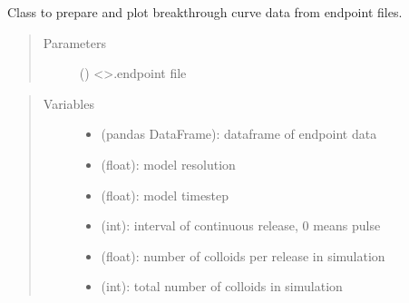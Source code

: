 \documentclass[letterpaper,10pt,english]{sphinxmanual}
\begin{document}
\begin{fulllineitems}
\begin{fulllineitems}
\begin{quote}
\begin{description}
\end{description}\end{quote}

\end{fulllineitems}


\end{fulllineitems}


\begin{fulllineitems}
\label{\detokenize{index:lb_colloids.Colloids.Colloid_output.Breakthrough}}
Class to prepare and plot breakthrough curve data from endpoint
files.
\begin{quote}\begin{description}
\item[{Parameters}] \leavevmode
{} () \textendash{} \textless{}\textgreater{}.endpoint file

\end{description}\end{quote}
\begin{quote}\begin{description}
\item[{Variables}] \leavevmode\begin{itemize}
\item {} 
 \textendash{} (pandas DataFrame): dataframe of endpoint data

\item {} 
{\hyperref[\detokenize{index:lb_colloids.LB.LB_2Dpermeability.LB2DModel.resolution}]{}} \textendash{} (float): model resolution

\item {} 
 \textendash{} (float): model timestep

\item {} 
 \textendash{} (int): interval of continuous release, 0 means pulse

\item {} 
 \textendash{} (float): number of colloids per release in simulation

\item {} 
 \textendash{} (int): total number of colloids in simulation


\end{itemize}
\end{description}
\end{quote}
\end{fulllineitems}
\end{document}
